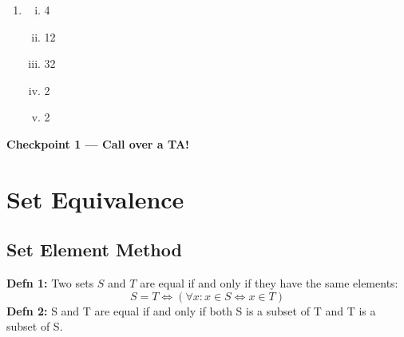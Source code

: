 \documentclass[12pt,letterpaper]{article}
\begin{document}
\begin{enumerate}[a.]
{\begin{enumerate}
\begin{enumerate}[i.]
  				$\left\{\varnothing,\left\{\varnothing\right\}\right\},
              \left\{\varnothing,\left\{0,\varnothing,1\right\}\right\},$

  				$\left\{\left\{\varnothing\right\},
              \left\{0,\varnothing,1\right\}\right\},$

  				$\hspace*{7pt} \left\{\varnothing,\left\{\varnothing\right\},
  				\left\{0,\varnothing,1\right\}\right\} \hspace*{2pt}\Big\}$
      		\item
            $\{1, 4, 9\}$
      		\item
            $\left \{ \left\{ 0,\varnothing, 1 \right\} \right \}$
          \item
            $\{(\varnothing, c), (\varnothing, d), (\varnothing, e),$

               $(0, c), (0, d), (0, e),$

               $(\{\varnothing\}, c),
               (\{\varnothing\}, d), (\{\varnothing\}, e),$

               $(\{0, \varnothing\}, c),
               (\{0, \varnothing\}, d), (\{0, \varnothing\}, e)\}$
          \item
            $\{(a,c),(a,d),(a,e),(b,c),(b,d),(b,e),(c,c),(d,c),(e,c)\}$
          \item
            $\varnothing$
      	\end{enumerate}
        \item \begin{enumerate}[i.]
          \item 4
          \item 12
          \item 32
          \item 2
          \item 2
        \end{enumerate}
    \end{enumerate}}
\end{enumerate}

\textbf{Checkpoint 1 — Call over a TA!}

\newpage
\section*{Set Equivalence}
\subsection*{Set Element Method}
\textbf{Defn 1:} Two sets $S$ and $T$ are equal if and only if they have the same elements:
\begin{equation*}
    S = T \iff (\forall x : x \in S \iff x \in T)
\end{equation*}
\textbf{Defn 2:} S and T are equal if and only if both S is a subset of T and T is a subset of S.
\end{document}
